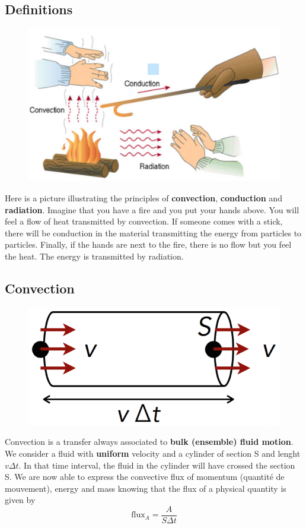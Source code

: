 \subsection{Definitions}
\begin{figure}
	\vspace{-5mm}
	\includegraphics[scale=0.3]{ch1/1}
\end{figure}
Here is a picture illustrating the principles of \textbf{convection}, \textbf{conduction} and \textbf{radiation}. Imagine that you have a fire and you put your hands above. You will feel a flow of heat transmitted by convection. If someone comes with a stick, there will be conduction in the material transmitting the energy from particles to particles. Finally, if the hands are next to the fire, there is no flow but you feel the heat. The energy is transmitted by radiation. 
	
\newpage

\subsection{Convection}
\begin{figure}
	\vspace{-5mm}
	\includegraphics[scale=0.3]{ch1/2}
\end{figure}
Convection is a transfer always associated to \textbf{bulk (ensemble) fluid motion}. We consider a fluid with \textbf{uniform} velocity and a cylinder of section S and lenght $v \Delta t$. In that time interval, the fluid in the cylinder will have crossed the section S. We are now able to express the convective flux of momentum (quantité de mouvement), energy and mass knowing that the flux of a physical quantity is given by 
\begin{equation}
	\text{flux}_A = \frac{A}{S\Delta t}
	\label{equation:1.5}
\end{equation}
	
